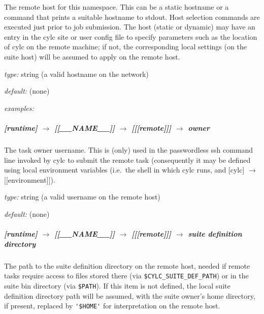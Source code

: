 The remote host for this namespace. This can be a static hostname or a
command that prints a suitable hostname to stdout. Host selection
commands are executed just prior to job submission. The host (static or
dynamic) may have an entry in the cylc site or user config file to
specify parameters such as the location of cylc on the remote machine;
if not, the corresponding local settings (on the suite host) will be
assumed to apply on the remote host. 

\begin{myitemize}
\item {\em type:} string (a valid hostname on the network)
\item {\em default:} (none)
\item {\em examples:}
\end{myitemize}


\subparagraph[owner]{[runtime] $\rightarrow$ [[\_\_NAME\_\_]] $\rightarrow$ [[[remote]]] $\rightarrow$ owner}

The task owner username. This is (only) used in the passwordless ssh
command line  invoked by cylc to submit the remote task (consequently it
may be defined using local environment variables 
(i.e.\ the shell in which cylc runs, and [cylc] $\rightarrow$ [[environment]]). 

\begin{myitemize}
\item {\em type:} string (a valid username on the remote host)
\item {\em default:} (none)
\end{myitemize}

\subparagraph[suite definition directory]{[runtime] $\rightarrow$ [[\_\_NAME\_\_]] $\rightarrow$ [[[remote]]] $\rightarrow$  suite definition directory}

The path to the suite definition directory on the remote host, needed if
remote tasks require access to files stored there (via
\lstinline=$CYLC_SUITE_DEF_PATH=) or in the suite bin directory (via
\lstinline=$PATH=).  If this item is not defined, the local suite
definition directory path will be assumed, with the suite owner's home
directory, if present, replaced by \lstinline='$HOME'= for
interpretation on the remote host. 

